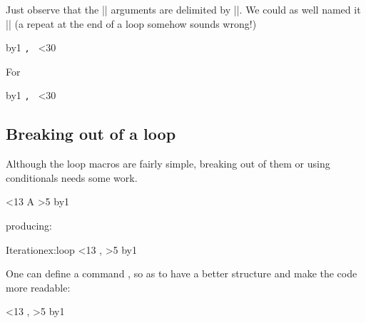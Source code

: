 Just observe that the |\loop| arguments are delimited by |\repeat|. We could as well named it |\endloop| (a repeat at the end of a loop somehow sounds wrong!)

\begin{teX}
\def\for#1\endfor{\def\body{#1}\iterate}
\def\iterate{\body\let\next=\iterate\else\let\next=\relax\fi\next}
\newcount\n
{}
\for
   \advance\n by1
     \texttt{\number\n, }  
   \ifnum\n<30
\endfor
\end{teX}  

\begin{texexample}{For}{}
\bgroup
\def\for#1\endfor{\def\body{#1}\iterate}
\def\iterates{\body\let\next=\iterates\else\let\next=\relax\fi\next}

\noindent\colorbox{gray!10}{\parbox{10cm}{\noindent
\newcount\n
{}
\for%
   \advance\n by1
     \texttt{\number\n, }%
   \ifnum\n<30%
\endfor%
}}
\egroup
\end{texexample}

\subsection{Breaking out of a loop}

Although the loop macros are fairly simple, breaking out of them or using conditionals needs some work.

\begin{teXXX}
\newcount\mycount
{}
\loop\ifnum\mycount<13
A 
\ifnum\mycount>5
    \let\iterate\relax
 \fi
 \advance\mycount by1\relax
\repeat
\end{teXXX}
\medskip
producing:
\medskip

\begin{texexample}{Iteration}{ex:loop}
\newcount\mycount
{}
\loop\ifnum\mycount<13
\the\mycount, 
\ifnum\mycount>5
    \let\iterate\relax
 \fi
 \advance\mycount by1\relax
\repeat
\end{texexample}

One can define a command \CMDI{\break}, so as to have a better structure and make the code more readable:

\begin{teXXX}
\def\break{\let\iterate\relax}
\newcount\mycount
{}
\loop\ifnum\mycount<13
\the\mycount, 
\ifnum\mycount>5
    \break    
\fi
\advance\mycount by1\relax
\repeat
\end{teXXX}





